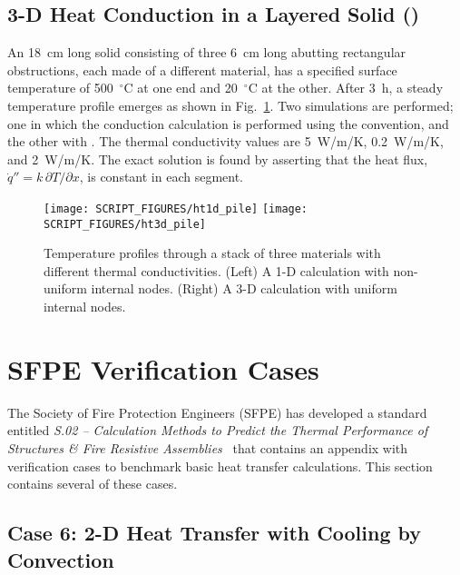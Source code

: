 \documentclass[11pt]{book}
\begin{document}
\FloatBarrier

\subsection{3-D Heat Conduction in a Layered Solid (\texorpdfstring{}{ht1d\_pile})}
\label{ht1d_pile}
\label{ht3d_pile}

An 18~cm long solid consisting of three 6~cm long abutting rectangular obstructions, each made of a different material, has a specified surface temperature of 500~$^\circ$C at one end and 20~$^\circ$C at the other. After 3~h, a steady temperature profile emerges as shown in Fig.~\ref{fig:ht3d_pile}. Two simulations are performed; one in which the conduction calculation is performed using the  convention, and the other with . The thermal conductivity values are 5~W/m/K, 0.2~W/m/K, and 2~W/m/K. The exact solution is found by asserting that the heat flux, $\dot{q}''=k \, \partial T / \partial x$, is constant in each segment.

\begin{figure}[ht]
\texttt{[image: SCRIPT\_FIGURES/ht1d\_pile]}
\texttt{[image: SCRIPT\_FIGURES/ht3d\_pile]}
\caption[The  and  test cases]{Temperature profiles through a stack of three materials with different thermal conductivities. (Left) A 1-D calculation with non-uniform internal nodes. (Right) A 3-D calculation with uniform internal nodes.}
\label{fig:ht3d_pile}
\end{figure}

\clearpage

\section{SFPE Verification Cases}

The Society of Fire Protection Engineers (SFPE) has developed a standard entitled {\em S.02 -- Calculation Methods to Predict the Thermal Performance of Structures \& Fire Resistive Assemblies}~\cite{SFPE_S.02} that contains an appendix with verification cases to benchmark basic heat transfer calculations. This section contains several of these cases.

\subsection{Case 6: 2-D Heat Transfer with Cooling by Convection}
\label{SFPE_Case_6}
\end{document}
